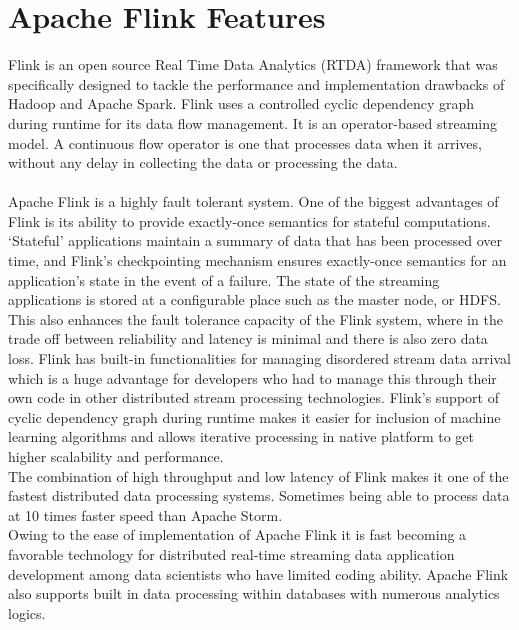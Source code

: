 \section{Apache Flink Features} 
Flink is an open source Real Time Data Analytics (RTDA) framework that was specifically designed to tackle the performance and implementation drawbacks of Hadoop and Apache Spark. Flink uses a controlled cyclic dependency graph during runtime for its data flow management. It is an operator-based streaming model. A continuous flow operator is one that processes data when it arrives, without any delay in collecting the data or processing the data\cite{link5}.
\\\\
Apache Flink is a highly fault tolerant system. One of the biggest advantages of Flink is its ability to provide exactly-once semantics for stateful computations. ‘Stateful’ applications maintain a summary of data that has been processed over time, and Flink’s checkpointing mechanism ensures exactly-once semantics for an application’s state in the event of a failure. The state of the streaming applications is stored at a configurable place such as the master node, or HDFS. This also enhances the fault tolerance capacity of the Flink system, where in the trade off between reliability and latency is minimal and there is also zero data loss. Flink has built-in functionalities for managing disordered stream data arrival which is a huge advantage for developers who had to manage this through their own code in other distributed stream processing technologies. Flink’s support of cyclic dependency graph during runtime makes it easier for inclusion of machine learning algorithms and allows iterative processing in native platform to get higher scalability and performance.\\
The combination of high throughput and low latency of Flink makes it one of the fastest distributed data processing  systems. Sometimes being able to process data at 10 times faster speed than Apache Storm.\\
Owing to the ease of implementation of Apache Flink it is fast becoming a favorable technology for distributed real-time streaming data application development among data scientists who have limited coding ability. Apache Flink also supports built in data processing within databases with numerous analytics logics.~\cite{link3} \\


